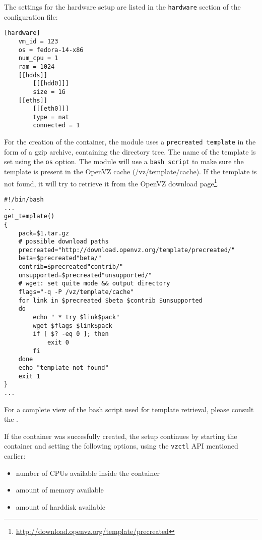 The settings for the hardware setup are listed in the \texttt{hardware} section of the 
configuration file:
\\
\lstset{language=Python,caption=Hardware section example,
label=lst:hardware}
\begin{lstlisting}
[hardware]
	vm_id = 123
	os = fedora-14-x86
	num_cpu = 1 
	ram = 1024
	[[hdds]]
		[[[hdd0]]]
		size = 1G
	[[eths]]
		[[[eth0]]]
		type = nat
		connected = 1
\end{lstlisting}

For the creation of the container, the module uses a \texttt{precreated template} in the form of a gzip 
archive, containing the directory tree. The name of the template is set using the \texttt{os} 
option. The module will use a \texttt{bash script} to make sure the template is present in the OpenVZ 
cache (/vz/template/cache). If the template is not found, it will try to retrieve it from the 
OpenVZ download page\footnote {\url {http://download.openvz.org/template/precreated}}.
\\
\lstset{language=bash,caption=Bash script to retrieve template,
label=lst:get-template}
\begin{lstlisting}
#!/bin/bash
...
get_template()
{
	pack=$1.tar.gz
	# possible download paths
	precreated="http://download.openvz.org/template/precreated/"
	beta=$precreated"beta/"
	contrib=$precreated"contrib/"
	unsupported=$precreated"unsupported/"
	# wget: set quite mode && output directory
	flags="-q -P /vz/template/cache"
	for link in $precreated $beta $contrib $unsupported
	do
		echo " * try $link$pack"
		wget $flags $link$pack
		if [ $? -eq 0 ]; then
			exit 0
		fi
	done
	echo "template not found"
	exit 1
}
...
\end{lstlisting}

For a complete view of the bash script used for template retrieval, please consult 
the .

If the container was succesfully created, the setup continues by starting the 
container and setting the following options, using the \texttt{vzctl} API 
mentioned earlier:
\begin{itemize}
  \item number of CPUs available inside the container
  \item amount of memory available
  \item amount of harddisk available
\end{itemize}

